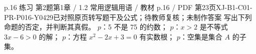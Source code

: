 \par\noindent\begin{minipage}{\linewidth}
\begin{bankitem}{p.16 练习 第2题}{第1章 / 1.2 常用逻辑用语 / 教材 p.16 / PDF 第23页}{XJ-B1-C01-PR-P016-Y0429}{已对照原页转写题干及公式；待教师复核；未制作答案}
写出下列命题的否定，并判断其真假。
$p$：5 不是 75 的约数；
$p$：$x>2$ 是不等式 $3x-6>0$ 的解；
$p$：方程 $x^2-2x+3=0$ 有实数根；
$p$：空集是集合 $A$ 的子集。
\end{bankitem}
\end{minipage}\par\medskip
